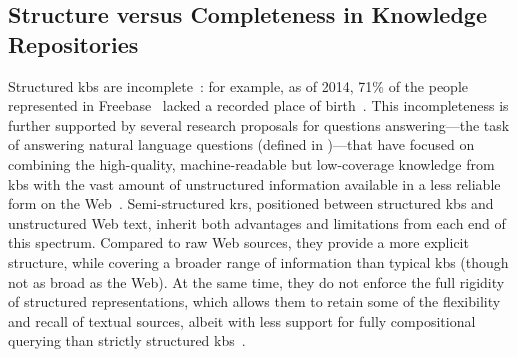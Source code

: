 



\subsection{Structure versus Completeness in Knowledge Repositories}
\label{sec:incompleteness}
%
Structured \aclp{kb} are incomplete~\cite{west_kb_completion_2014,entityorientedsearch2018balog}: for example, as of 2014, 71\% of the people represented in Freebase~\cite{freebase_2008} lacked a recorded place of birth~\cite{west_kb_completion_2014}.
This incompleteness is further supported by several research proposals for questions answering---the task of answering natural language questions (defined in )---that have focused on combining the high-quality, machine-readable but low-coverage knowledge from \acp{kb} with the vast amount of unstructured information available in a less reliable form on the Web~\cite{sawant_neural_kg_web_2016,west_kb_completion_2014,savenkov_qa_kb_text_2016,PRAMANIK2024100833_uniqorn_qa_kb_text,lehmann2024beyond,zhang-etal-2024-spaghetti_heterogeneus_qa,xin_atomr_heterogeneus_kg_2025,dehghan-etal-2024-ewek}.
%
Semi-structured \aclp{kr}, positioned between structured \acp{kb} and unstructured Web text, inherit both advantages and limitations from each end of this spectrum. Compared to raw Web sources, they provide a more explicit structure, while covering a broader range of information than typical \acp{kb} (though not as broad as the Web). At the same time, they do not enforce the full rigidity of structured representations, which allows them to retain some of the flexibility and recall of textual sources, albeit with less support for fully compositional querying than strictly structured \acp{kb}~\cite{lehmann2024beyond}.



